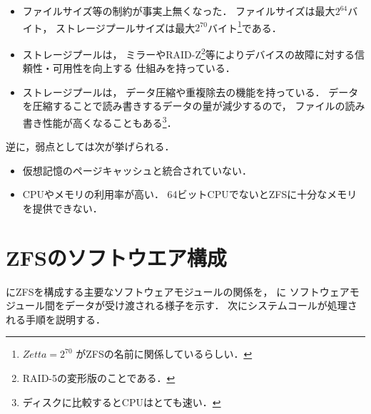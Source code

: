\begin{itemize}
\item ファイルサイズ等の制約が事実上無くなった．
  ファイルサイズは最大$2^{64}$バイト，
  ストレージプールサイズは最大$2^{70}$バイト\footnote{
    $Zetta = 2^{70}$ がZFSの名前に関係しているらしい．
  }である．

\item ストレージプールは，
  ミラーやRAID-Z\footnote{
    RAID-5の変形版のことである．
  }等によりデバイスの故障に対する信頼性・可用性を向上する
  仕組みを持っている．

\item ストレージプールは，
  データ圧縮や重複除去の機能を持っている．
  データを圧縮することで読み書きするデータの量が減少するので，
  ファイルの読み書き性能が高くなることもある\footnote{
    ディスクに比較するとCPUはとても速い．}．
\end{itemize}

逆に，弱点としては次が挙げられる．
\begin{itemize}
\item 仮想記憶のページキャッシュと統合されていない．
\item CPUやメモリの利用率が高い．
  64ビットCPUでないとZFSに十分なメモリを提供できない．
\end{itemize}

\section{ZFSのソフトウエア構成}
にZFSを構成する主要なソフトウェアモジュールの関係を，
に
ソフトウェアモジュール間をデータが受け渡される様子を示す．
次にシステムコールが処理される手順を説明する．

